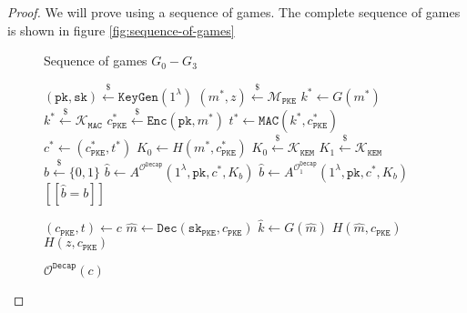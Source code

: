 \documentclass[floatrow,journal=tches,submission]{iacrtrans}
\newcommand{\pke}{\texttt{PKE}}
\newcommand{\keygen}{\texttt{KeyGen}}
\newcommand{\encrypt}{\texttt{Enc}}
\newcommand{\decrypt}{\texttt{Dec}}
\newcommand{\kem}{\texttt{KEM}}
\newcommand{\decap}{\texttt{Decap}}
\newcommand{\mac}{\texttt{MAC}}
\newcommand{\pk}{\texttt{pk}}
\newcommand{\sk}{\texttt{sk}}
\newcommand{\leftsample}{\stackrel{\$}{\leftarrow}}
\newcommand{\llbrack}{[\![}
\newcommand{\rrbrack}{]\!]}
\begin{document}
\begin{proof}
    We will prove using a sequence of games. The complete sequence of games is shown in figure \ref{fig:sequence-of-games}

    \begin{figure}[H]
        \centering
        \begin{algorithm}[H]
            \caption{Sequence of games $G_0 - G_3$}\label{alg:sequence-of-games}
            \begin{algorithmic}[1]
                \State $(\pk, \sk) \leftsample \keygen(1^\lambda)$
                \State $(m^\ast, z) \leftsample \mathcal{M}_\pke$
                \State $k^\ast \leftarrow G(m^\ast)$
                \State $k^\ast \leftsample \mathcal{K}_\mac$
                \State $c^\ast_\pke \leftsample \encrypt(\pk, m^\ast)$
                \State $t^\ast \leftarrow \mac(k^\ast, c^\ast_\pke)$
                \State $c^\ast \leftarrow (c^\ast_\pke, t^\ast)$
                \State $K_0 \leftarrow H(m^\ast, c^\ast_\pke)$
                \State $K_0 \leftsample \mathcal{K}_\kem$
                \State $K_1 \leftsample \mathcal{K}_\kem$
                \State $b \leftsample \{0,1\}$
                \State $\hat{b} \leftarrow A^{\mathcal{O}^\decap}(
                    1^\lambda, \pk, c^\ast, K_b)$
                \State $\hat{b} \leftarrow A^{\mathcal{O}^\decap_1}(
                    1^\lambda, \pk, c^\ast, K_b)$
                \State \Return $\llbrack \hat{b} = b \rrbrack$
            \end{algorithmic}
        \end{algorithm}
        \begin{algorithm}[H]
            \caption{$\mathcal{O}^\decap(c)$}\label{alg:etm-decap-oracle}
            \begin{algorithmic}[1]
                \State $(c_\pke, t) \leftarrow c$
                \State $\hat{m} \leftarrow \decrypt(\sk_\pke, c_\pke)$
                \State $\hat{k} \leftarrow G(\hat{m})$
                \If{$\mac(\hat{k}, c_\pke) = t$}
                    \State \Return $H(\hat{m}, c_\pke)$
                \EndIf
                \State \Return $H(z, c_\pke)$
            \end{algorithmic}
        \end{algorithm}
        \begin{algorithm}[H]

\end{algorithm}
\end{figure}
\end{proof}
\end{document}
